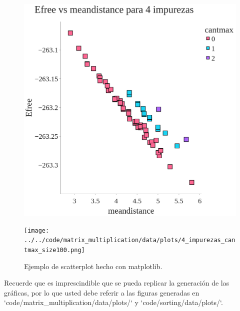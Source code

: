 \begin{figure}[H]
    \centering
    \begin{minipage}[t]{0.5\textwidth}
        \includegraphics[width=\textwidth]{../../code/matrix_multiplication/data/plots/4_impurezas_cantmax_size10.png}
    \end{minipage}%
    \begin{minipage}[t]{0.5\textwidth}
        \texttt{[image: ../../code/matrix\_multiplication/data/plots/4\_impurezas\_cantmax\_size100.png]}
     \end{minipage}%
    \caption{Ejemplo de scatterplot hecho con matplotlib.}
    \label{fig:scatterplot_3}
\end{figure}





\begin{mdframed}
    Recuerde que es imprescindible que se pueda replicar la generación de las gráficas, por lo que usted debe referir a las figuras generadas en `code/matrix_multiplication/data/plots/` y `code/sorting/data/plots/`.
\end{mdframed}
